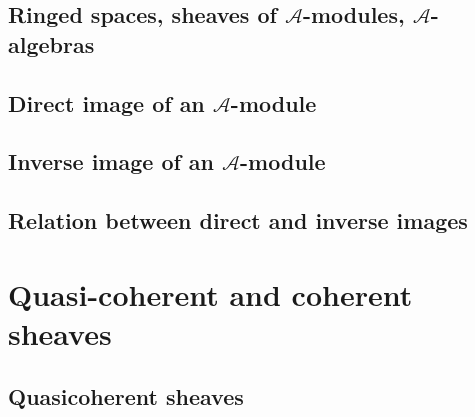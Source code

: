 \documentclass{book}
\newcommand{\sheaf}{\mathcal}
\begin{document}
        \subsection{Ringed spaces, sheaves of $\sheaf{A}$-modules, $\sheaf{A}$-algebras}

        \label{0-prelim-4.1}

        



        \subsection{Direct image of an $\sheaf{A}$-module}

        \label{0-prelim-4.2}

        



        \subsection{Inverse image of an $\sheaf{A}$-module}

        \label{0-prelim-4.3}

        



        \subsection{Relation between direct and inverse images}

        \label{0-prelim-4.4}

        



    \section{Quasi-coherent and coherent sheaves}

    \label{0-prelim-5}



        \subsection{Quasicoherent sheaves}

        \label{0-prelim-5.1}

        
\end{document}
